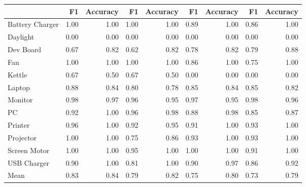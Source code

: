 \begin{tabular}{lrrrrrrrr}
\toprule
{} &    F1 &  Accuracy &    F1 &  Accuracy &    F1 &  Accuracy &    F1 &  Accuracy \\
\midrule
Battery Charger &  1.00 &      1.00 &  1.00 &      1.00 &  0.89 &      1.00 &  0.86 &      1.00 \\
Daylight        &  0.00 &      0.00 &  0.00 &      0.00 &  0.00 &      0.00 &  0.00 &      0.00 \\
Dev Board       &  0.67 &      0.82 &  0.62 &      0.82 &  0.78 &      0.82 &  0.79 &      0.88 \\
Fan             &  1.00 &      1.00 &  1.00 &      1.00 &  0.86 &      1.00 &  0.75 &      1.00 \\
Kettle          &  0.67 &      0.50 &  0.67 &      0.50 &  0.00 &      0.00 &  0.00 &      0.00 \\
Laptop          &  0.88 &      0.84 &  0.80 &      0.78 &  0.85 &      0.84 &  0.85 &      0.82 \\
Monitor         &  0.98 &      0.97 &  0.96 &      0.95 &  0.97 &      0.95 &  0.98 &      0.96 \\
PC              &  0.92 &      1.00 &  0.96 &      0.98 &  0.88 &      0.98 &  0.85 &      0.87 \\
Printer         &  0.96 &      1.00 &  0.92 &      0.95 &  0.91 &      1.00 &  0.93 &      1.00 \\
Projector       &  1.00 &      1.00 &  0.75 &      0.86 &  0.93 &      1.00 &  0.93 &      1.00 \\
Screen Motor    &  1.00 &      1.00 &  0.95 &      1.00 &  1.00 &      1.00 &  0.91 &      1.00 \\
USB Charger     &  0.90 &      1.00 &  0.81 &      1.00 &  0.90 &      0.97 &  0.86 &      0.92 \\
Mean            &  0.83 &      0.84 &  0.79 &      0.82 &  0.75 &      0.80 &  0.73 &      0.79 \\
\bottomrule
\end{tabular}

